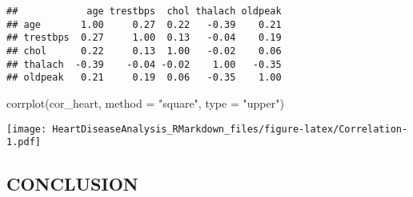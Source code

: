 \documentclass[
]{article}
\newenvironment{Shaded}{\begin{snugshade}}{\end{snugshade}}
\newcommand{\AttributeTok}[1]{\textcolor[rgb]{0.77,0.63,0.00}{#1}}
\newcommand{\FunctionTok}[1]{\textcolor[rgb]{0.00,0.00,0.00}{#1}}
\newcommand{\NormalTok}[1]{#1}
\newcommand{\StringTok}[1]{\textcolor[rgb]{0.31,0.60,0.02}{#1}}
\begin{document}
\begin{verbatim}
##            age trestbps  chol thalach oldpeak
## age       1.00     0.27  0.22   -0.39    0.21
## trestbps  0.27     1.00  0.13   -0.04    0.19
## chol      0.22     0.13  1.00   -0.02    0.06
## thalach  -0.39    -0.04 -0.02    1.00   -0.35
## oldpeak   0.21     0.19  0.06   -0.35    1.00
\end{verbatim}

\begin{Shaded}
\begin{Highlighting}[]
\FunctionTok{corrplot}\NormalTok{(cor\_heart, }\AttributeTok{method =} \StringTok{"square"}\NormalTok{, }\AttributeTok{type =} \StringTok{"upper"}\NormalTok{)}
\end{Highlighting}
\end{Shaded}

\texttt{[image: HeartDiseaseAnalysis\_RMarkdown\_files/figure-latex/Correlation-1.pdf]}

\hypertarget{conclusion}{%
\subsection{CONCLUSION}\label{conclusion}}
\end{document}

